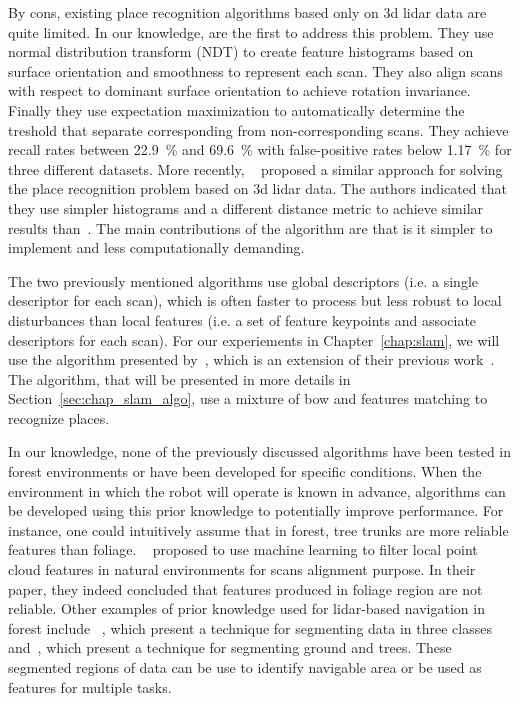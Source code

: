By cons, existing place recognition algorithms based only on \gls*{3d} \gls*{lidar} data are quite limited. In our knowledge, \citet{Magnusson2009} are the first to address this problem. They use normal distribution transform (NDT) to create feature histograms based on surface orientation and smoothness to represent each scan. They also align scans with respect to dominant surface orientation to achieve rotation invariance. Finally they use expectation maximization to automatically determine the treshold that separate corresponding from non-corresponding scans. They achieve recall rates between \SI{22.9}{\percent} and \SI{69.6}{\percent} with false-positive rates below \SI{1.17}{\percent} for three different datasets. More recently, ~\citet{Mack2015} proposed a similar approach for solving the place recognition problem based on \gls*{3d} lidar data. The authors indicated that they use simpler histograms and a different distance metric to achieve similar results than~\citet{Magnusson2009}. The main contributions of the algorithm are that is it simpler to implement and less computationally demanding.

The two previously mentioned algorithms use global descriptors (i.e. a single descriptor for each scan), which is often faster to process but less robust to local disturbances than local features (i.e. a set of feature keypoints and associate descriptors for each scan). For our experiements in Chapter~\ref{chap:slam}, we will use the algorithm presented by~\cite{Steder2011b}, which is an extension of their previous work~\cite{Steder2010}. The algorithm, that will be presented in more details in Section~\ref{sec:chap_slam_algo}, use a mixture of \gls*{bow} and features matching to recognize places.


In our knowledge, none of the previously discussed algorithms have been tested in forest environments or have been developed for specific conditions. When the environment in which the robot will operate is known in advance, algorithms can be developed using this prior knowledge to potentially improve performance. For instance, one could intuitively assume that in forest, tree trunks are more reliable features than foliage. ~\citet{Latulippe2013} proposed to use machine learning to filter local point cloud features in natural environments for scans alignment purpose. In their paper, they indeed concluded that features produced in foliage region are not reliable. Other examples of prior knowledge used for \gls*{lidar}-based navigation in forest include ~\citep{Lalonde2006}, which present a technique for segmenting data in three classes and~\cite{Mcdaniel2012}, which present a technique for segmenting ground and trees. These segmented regions of data can be use to identify navigable area or be used as features for multiple tasks.

